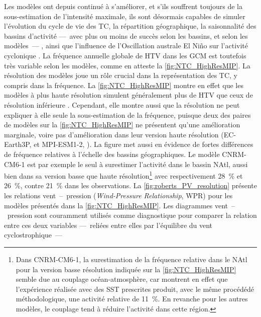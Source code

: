\documentclass[../main.tex]{subfiles}
\begin{document}
Les modèles ont depuis continué à s'améliorer, et s'ils souffrent toujours de la sous-estimation de l'intensité maximale, ils sont désormais capables de simuler
l'évolution du cycle de vie des TC, la répartition géographique, la saisonnalité des bassins d'activité ---~avec plus ou moins de succès selon les bassins, et
selon les modèles~--- \parencite{bengtsson_tropical_2007,zhao_simulations_2009,shaevitz_characteristics_2014}, ainsi que l'influence de l'Oscillation australe
El Niño sur l'activité cyclonique \parencite{vitart_simulation_1997,gualdi_changes_2008,camargo_experimental_2009}. La fréquence annuelle globale de HTV dans
les GCM est toutefois très variable selon les modèles, comme en atteste la \cref{fig:NTC_HighResMIP}. La résolution des modèles joue un rôle crucial dans la
représentation des TC, y compris dans la fréquence. La \cref{fig:NTC_HighResMIP} montre en effet que les modèles à plus haute résolution simulent généralement
plus de HTV que ceux de résolution inférieure \parencite{camargo_global_2013,roberts_impact_2020}. Cependant, elle montre aussi que la résolution ne peut
expliquer à elle seule la sous-estimation de la fréquence, puisque deux des paires de modèles sur la \cref{fig:NTC_HighResMIP} ne présentent qu'une amélioration
marginale, voire pas d'amélioration dans leur version haute résolution (EC-Earth3P, \textcite{haarsma_highresmip_2020} et MPI-ESM1-2, \textcite{gutjahr_max_2019}). La
figure met aussi en évidence de fortes différences de fréquence relatives à l'échelle des bassins géographiques. Le modèle CNRM-CM6-1 est par exemple le seul à
surestimer l'activité dans le bassin NAtl, aussi bien dans sa version basse que haute résolution\footnote{Dans CNRM-CM6-1, la surestimation de la fréquence
relative dans le NAtl pour la version basse résolution indiquée sur la \cref{fig:NTC_HighResMIP} semble due au couplage océan-atmosphère, car
\textcite{roberts_impact_2020} montrent en effet que l'expérience réalisée avec des SST prescrites produit, avec le même procédédé méthodologique, une activité
relative de \SI{11}{\percent}. En revanche pour les autres modèles, le couplage tend à réduire l'activité dans cette région.} avec respectivement
\SI{28}{\percent} et \SI{26}{\percent}, contre \SI{21}{\percent} dans les observations. La \cref{fig:roberts_PV_resolution} présente les relations
vent~--~pression (\textit{Wind-Pressure Relationship}, WPR) pour les modèles présentés dans la \cref{fig:NTC_HighResMIP}. Les diagrammes vent~--~pression sont
couramment utilisés comme diagnostique pour comparer la relation entre ces deux variables ---~reliées entre elles par l'équilibre du vent cyclostrophique~---
\end{document}
